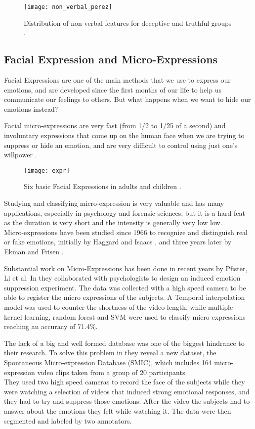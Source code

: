 \begin{figure}[H]
	\centering
	\texttt{[image: non\_verbal\_perez]}
	\caption{Distribution of non-verbal features for deceptive and truthful groups \cite{Perez-Rosas:2015:DDU:2818346.2820758}.}
\end{figure}

\subsection{Facial Expression and Micro-Expressions}
Facial Expressions are one of the main methods that we use to express our emotions, and are developed since the first months of our life to help us communicate our feelings to others. But what happens when we want to hide our emotions instead? 

Facial micro-expressions are very fast (from 1/2 to 1/25 of a second) and involuntary expressions that come up on the human face when we are trying to suppress or hide an emotion, and are very difficult to control using just one's willpower \cite{EkmanER}.

\begin{figure}[H]
	\centering
	\texttt{[image: expr]}
	\caption{Six basic Facial Expressions in adults and children \cite{baby_fe}.}
\end{figure}

Studying and classifying micro-expression is very valuable and has many applications, especially in psychology and forensic sciences, but it is a hard feat as the duration is very short and the intensity is generally very low low.\\ 
Micro-expressions have been studied since 1966 to recognize and distinguish real or fake emotions, initially by Haggard and Isaacs \cite{Haggard}, and three years later by Ekman and Frisen \cite{EkmanLeakage}.

Substantial work on Micro-Expressions has been done in recent years by Pfister, Li et al. In \cite{pfister2011micro} they collaborated with psychologists to design an induced emotion suppression experiment. The data was collected with a high speed camera to be able to register the micro expressions of the subjects. A Temporal interpolation model was used to counter the shortness of the video length, while multiple kernel learning, random forest and SVM were used to classify micro expressions reaching an accuracy of 71.4\%.

The lack of a big and well formed database was one of the biggest hindrance to their research. To solve this problem in \cite{xli2012spontaneous} they reveal a new dataset, the Spontaneous Micro-expression Database (SMIC), which includes 164 micro-expression video clips taken from a group of 20 participants.\\
They used two high speed cameras to record the face of the subjects while they were watching a selection of videos that induced strong emotional responses, and they had to try and suppress those emotions. After the video the subjects had to answer about the emotions they felt while watching it. The data were then segmented and labeled by two annotators.

